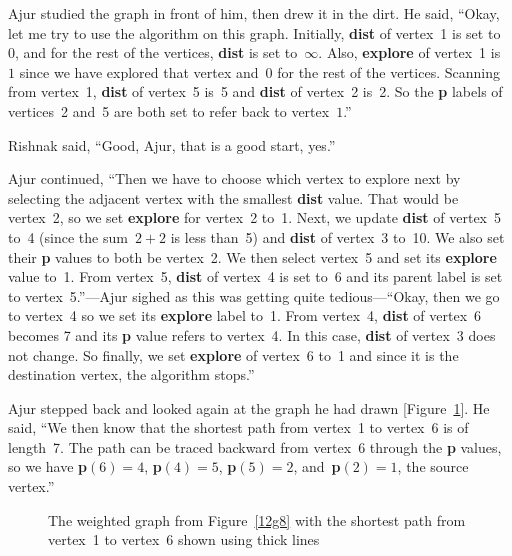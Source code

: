 Ajur studied the graph in front of him, then drew it in the dirt.  He said, ``Okay, let me try to use the algorithm on this graph. Initially, \textbf{dist} of vertex~1 is set to~$0$, and for the rest of the vertices, \textbf{dist} is set to~$\infty$. Also, \textbf{explore} of vertex~1 is~$1$ since we have explored that vertex and~$0$ for the rest of the vertices. Scanning from vertex~1, \textbf{dist} of vertex~5 is~5 and \textbf{dist} of vertex~2 is~2. So the \textbf{p} labels of vertices~2 and~5 are both set to refer back to vertex~$1$.''

Rishnak said, ``Good, Ajur, that is a good start, yes.''

Ajur continued, ``Then we have to choose which vertex to explore next by selecting the adjacent vertex with the smallest \textbf{dist} value. That would be vertex~2, so we set \textbf{explore} for vertex~2 to~1. Next, we update \textbf{dist} of vertex~5 to~4 (since the sum~$2+2$ is less than~5) and \textbf{dist} of vertex~3 to~10. We also set their \textbf{p} values to both be vertex~2. We then select vertex~5 and set its \textbf{explore} value to~1. From vertex~5, \textbf{dist} of vertex~4 is set to~6 and its parent label is set to vertex~5.''---Ajur sighed as this was getting quite tedious---``Okay, then we go to vertex~4 so we set its \textbf{explore} label to~1. From vertex~4, \textbf{dist} of vertex~6 becomes 7 and its \textbf{p} value refers to vertex~4. In this case, \textbf{dist} of vertex~3 does not change. So finally, we set \textbf{explore} of vertex~6 to~1 and since it is the destination vertex, the algorithm stops.''

Ajur stepped back and looked again at the graph he had drawn [Figure~\ref{12g9}].  He said, ``We then know that the shortest path from vertex~1 to vertex~6 is of length~7. The path can be traced backward from vertex~6 through the \textbf{p} values, so we have \textbf{p}$(6)=4$, \textbf{p}$(4)=5$, \textbf{p}$(5)=2$, and~\textbf{p}$(2)=1$, the source vertex.''

\begin{figure}
\begin{center}
\caption{The weighted graph from Figure~\ref{12g8} with the shortest path from vertex~1 to vertex~6 shown using thick lines}\label{12g9}
\end{center}
\end{figure}

